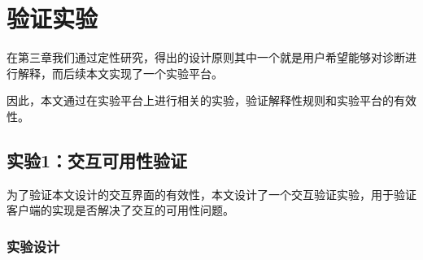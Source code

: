\chapter{验证实验}

在第三章我们通过定性研究，得出的设计原则其中一个就是用户希望能够对诊断进行解释，而后续本文实现了一个实验平台。

因此，本文通过在实验平台上进行相关的实验，验证解释性规则和实验平台的有效性。


\section{实验1：交互可用性验证}



为了验证本文设计的交互界面的有效性，本文设计了一个交互验证实验，用于验证客户端的实现是否解决了交互的可用性问题。

\subsection{实验设计}

